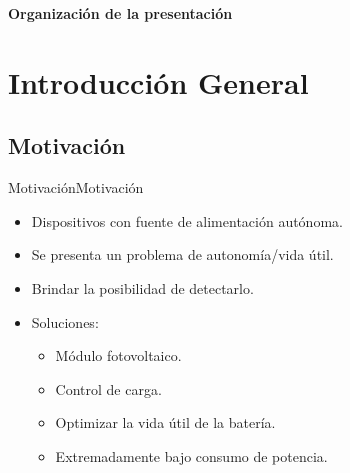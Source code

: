 \documentclass[aspectratio=169, handout]{beamer}
\begin{document}

\begin{frame}{\textbf{Organización de la presentación}}
  \tableofcontents
\end{frame}
%
%

\section{Introducción General}

\subsection[Motivación]{Motivación}

\begin{frame}{Motivación}{Motivación}
	\begin{itemize}
		\item Dispositivos con fuente de alimentación autónoma.
		\vspace{5px}
		\item Se presenta un problema de autonomía/vida útil.
		\vspace{5px}
		\item Brindar la posibilidad de detectarlo.
		\vspace{5px}
		\item Soluciones:
		\begin{itemize}
			\item Módulo fotovoltaico.
			\item Control de carga.
			\item Optimizar la vida útil de la batería.
			\item Extremadamente bajo consumo de potencia.
		\end{itemize}
	\end{itemize}

%	
\end{frame}

\end{document}
